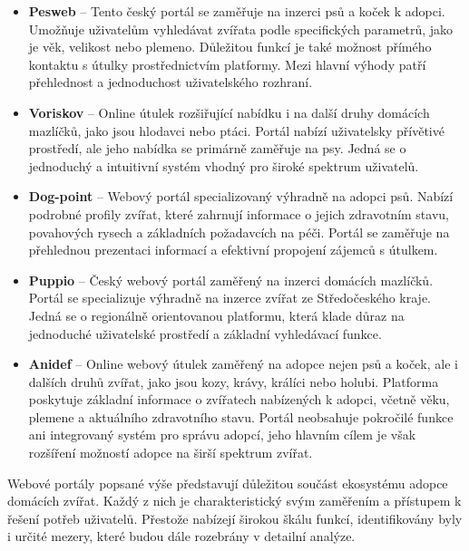 \documentclass[czech, bp, kiv, he, iso690numb, pdf]{fasthesis}
\begin{document}
    \begin{itemize}
        \item \textbf{Pesweb} -- Tento český portál se zaměřuje na inzerci psů a koček k adopci. Umožňuje uživatelům vyhledávat zvířata podle specifických parametrů, jako je věk, velikost nebo plemeno. Důležitou funkcí je také možnost přímého kontaktu s útulky prostřednictvím platformy. Mezi hlavní výhody patří přehlednost a jednoduchost uživatelského rozhraní.

        \item \textbf{Voriskov} -- Online útulek rozšiřující nabídku i na další druhy domácích mazlíčků, jako jsou hlodavci nebo ptáci. Portál nabízí uživatelsky přívětivé prostředí, ale jeho nabídka se primárně zaměřuje na psy. Jedná se o jednoduchý a intuitivní systém vhodný pro široké spektrum uživatelů.

        \item \textbf{Dog-point} -- Webový portál specializovaný výhradně na adopci psů. Nabízí podrobné profily zvířat, které zahrnují informace o jejich zdravotním stavu, povahových rysech a základních požadavcích na péči. Portál se zaměřuje na přehlednou prezentaci informací a efektivní propojení zájemců s útulkem.

        \item \textbf{Puppio} -- Český webový portál zaměřený na inzerci domácích mazlíčků. Portál se specializuje výhradně na inzerce zvířat ze Středočeského kraje. Jedná se o regionálně orientovanou platformu, která klade důraz na jednoduché uživatelské prostředí a základní vyhledávací funkce.

        \item \textbf{Anidef} -- Online webový útulek zaměřený na adopce nejen psů a koček, ale i dalších druhů zvířat, jako jsou kozy, krávy, králíci nebo holubi. Platforma poskytuje základní informace o zvířatech nabízených k adopci, včetně věku, plemene a aktuálního zdravotního stavu. Portál neobsahuje pokročilé funkce ani integrovaný systém pro správu adopcí, jeho hlavním cílem je však rozšíření možností adopce na širší spektrum zvířat.
    \end{itemize}

    Webové portály popsané výše představují důležitou součást ekosystému adopce domácích zvířat. Každý z nich je charakteristický svým zaměřením a přístupem k řešení potřeb uživatelů. Přestože nabízejí širokou škálu funkcí, identifikovány byly i určité mezery, které budou dále rozebrány v detailní analýze.
\end{document}
